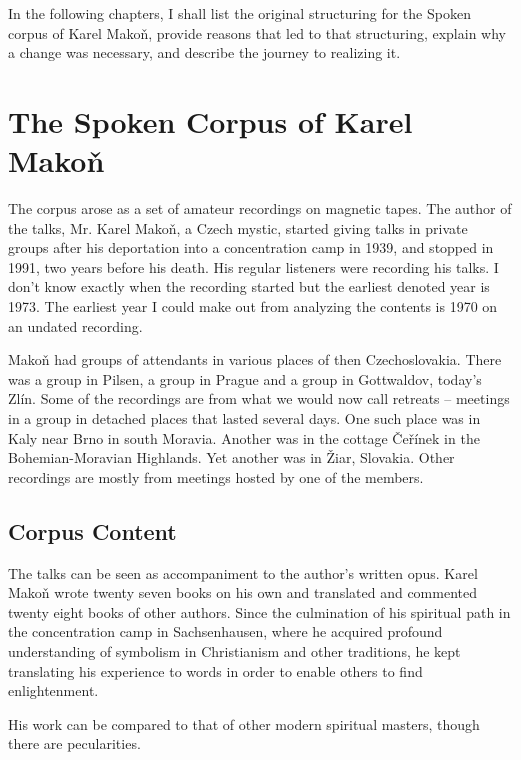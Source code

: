\documentclass{llncs}
\begin{document}
In the following chapters, I shall list the original structuring for the Spoken
corpus of Karel Makoň, provide reasons that led to that structuring, explain why
a change was necessary, and describe the journey to realizing it.

\section{The Spoken Corpus of Karel Makoň}

The corpus arose as a set of amateur recordings on magnetic tapes. The author of
the talks, Mr. Karel Makoň\cite{hajek2007cesky}, a Czech mystic, started giving talks in private
groups after his deportation into a concentration camp in 1939, and stopped in
1991, two years before his death. His regular listeners were recording his
talks. I don't know exactly when the recording started but the earliest denoted
year is 1973. The earliest year I could make out from analyzing the contents is
1970 on an undated recording.

Makoň had groups of attendants in various places of then Czechoslovakia. There
was a group in Pilsen, a group in Prague and a group in Gottwaldov, today's
Zlín. Some of the recordings are from what we would now call retreats -- meetings
in a group in detached places that lasted several days. One such place was in
Kaly near Brno in south Moravia. Another was in the cottage Čeřínek in the
Bohemian-Moravian Highlands. Yet another was in Žiar, Slovakia. Other recordings are mostly from meetings hosted by one of
the members.

\subsection{Corpus Content}

The talks can be seen as accompaniment to the author's written opus. Karel Makoň
wrote twenty seven books on his own and translated and commented twenty eight
books of other authors. Since the culmination of his spiritual path in the
concentration camp in Sachsenhausen, where he acquired profound understanding of
symbolism in Christianism and other traditions, he kept translating his
experience to words in order to enable others to find enlightenment.

His work can be compared to that of other modern spiritual masters, though there
are pecularities.
\end{document}
